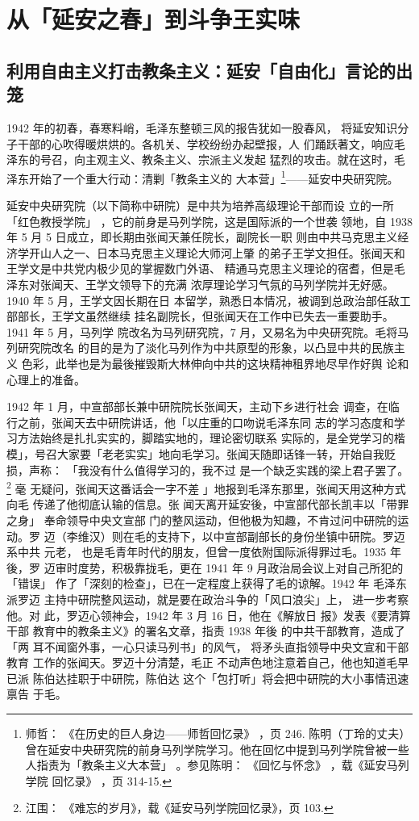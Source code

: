 \chapter{从「延安之春」到斗争王实味}
\section{利用自由主义打击教条主义：延安「自由化」言论的出
笼}

1942 年的初春，春寒料峭，毛泽东整顿三风的报告犹如一股春风，
将延安知识分子干部的心吹得暖烘烘的。各机关、学校纷纷办起壁报，人
们踊跃著文，响应毛泽东的号召，向主观主义、教条主义、宗派主义发起
猛烈的攻击。就在这时，毛泽东开始了一个重大行动：清剿「教条主义的
大本营」\footnote{师哲：
《在历史的巨人身边——师哲回忆录》
，页 246. 陈明（丁玲的丈夫）曾在延安中央研究院的前身马列学院学习。他在回忆中提到马列学院曾被一些人指责为「教条主义大本营」
。参见陈明：
《回忆与怀念》
，载《延安马列学院
回忆录》
，页 314-15.
}——延安中央研究院。

延安中央研究院（以下简称中研院）是中共为培养高级理论干部而设
立的一所「红色教授学院」
，它的前身是马列学院，这是国际派的一个世袭
领地，自 1938 年 5 月 5 日成立，即长期由张闻天兼任院长，副院长一职
则由中共马克思主义经济学开山人之一、日本马克思主义理论大师河上肇
的弟子王学文担任。张闻天和王学文是中共党内极少见的掌握数门外语、
精通马克思主义理论的宿耆，但是毛泽东对张闻天、王学文领导下的充满
浓厚理论学习气氛的马列学院并无好感。1940 年 5 月，王学文因长期在日
本留学，熟悉日本情况，被调到总政治部任敌工部部长，王学文虽然继续
挂名副院长，但张闻天在工作中已失去一重要助手。1941 年 5 月，马列学
院改名为马列研究院，7 月，又易名为中央研究院。毛将马列研究院改名
的目的是为了淡化马列作为中共原型的形象，以凸显中共的民族主义
色彩，此举也是为最後摧毁斯大林伸向中共的这块精神租界地尽早作好舆
论和心理上的准备。

1942 年 1 月，中宣部部长兼中研院院长张闻天，主动下乡进行社会 调查，在临
行之前，张闻天去中研院讲话，他「以庄重的口吻说毛泽东同 志的学习态度和学
习方法始终是扎扎实实的，脚踏实地的，理论密切联系 实际的，是全党学习的楷
模」，号召大家要「老老实实」地向毛学习。张闻天随即话锋一转，开始自我贬
损，声称： 「我没有什么值得学习的，我不过 是一个缺乏实践的梁上君子罢了。
\footnote{江围： 《难忘的岁月》，载《延安马列学院回忆录》，页 103.} 毫
无疑问，张闻天这番话会一字不差 」地报到毛泽东那里，张闻天用这种方式向毛
传递了他彻底认输的信息。张 闻天离开延安後，中宣部代部长凯丰以「带罪之身」
奉命领导中央文宣部 门的整风运动，但他极为知趣，不肯过问中研院的运动。罗
迈（李维汉）则在毛的支持下，以中宣部副部长的身份坐镇中研院。罗迈系中共
元老， 也是毛青年时代的朋友，但曾一度依附国际派得罪过毛。1935 年後，罗
迈审时度势，积极靠拢毛，更在 1941 年 9 月政治局会议上对自己所犯的 「错误」
作了「深刻的检查」，已在一定程度上获得了毛的谅解。1942 年 毛泽东派罗迈
主持中研院整风运动，就是要在政治斗争的「风口浪尖」上， 进一步考察他。对
此，罗迈心领神会，1942 年 3 月 16 日，他在《解放日 报》发表《要清算干部
教育中的教条主义》的署名文章，指责 1938 年後 的中共干部教育，造成了「两
耳不闻窗外事，一心只读马列书」的风气， 将矛头直指领导中央文宣和干部教育
工作的张闻天。罗迈十分清楚，毛正 不动声色地注意着自己，他也知道毛早已派
陈伯达挂职于中研院，陈伯达 这个「包打听」将会把中研院的大小事情迅速禀告
于毛。

